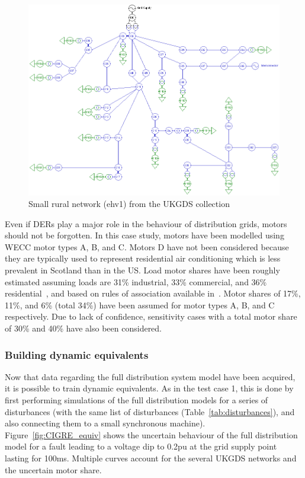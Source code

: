 \begin{figure}
    \centering
    \includegraphics[width=0.8\linewidth]{Figs/ehv1.png}
    \caption{Small rural network (ehv1) from the UKGDS collection~\cite{UKGDS}}
    \label{fig:ehv1}
\end{figure}

Even if DERs play a major role in the behaviour of distribution grids, motors should not be forgotten. In this case study, motors have been modelled using WECC motor types A, B, and C. Motors D have not been considered because they are typically used to represent residential air conditioning which is less prevalent in Scotland than in the US. Load motor shares have been roughly estimated assuming loads are 31\% industrial, 33\% commercial, and 36\% residential~\cite{UK_motor_share}, and based on rules of association available in~\cite{WECC_CLM_association}. Motor shares of 17\%, 11\%, and 6\% (total 34\%) have been assumed for motor types A, B, and C respectively. Due to lack of confidence, sensitivity cases with a total motor share of 30\% and 40\% have also been considered.

\subsubsection{Building dynamic equivalents}
\label{sec:CIGRE_distrib_equiv}

Now that data regarding the full distribution system model have been acquired, it is possible to train dynamic equivalents. As in the test case 1, this is done by first performing simulations of the full distribution models for a series of disturbances (with the same list of disturbances (Table~\ref{tab:disturbances}), and also connecting them to a small synchronous machine). Figure~\ref{fig:CIGRE_equiv} shows the uncertain behaviour of the full distribution model for a fault leading to a voltage dip to 0.2pu at the grid supply point lasting for 100ms. Multiple curves account for the  several UKGDS networks and the uncertain motor share.

